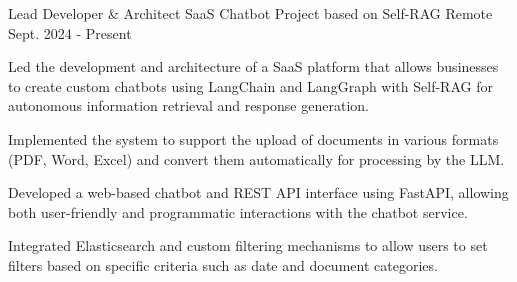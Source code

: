 
\begin{cventries}

  \cventry
    {Lead Developer \& Architect} %
    {SaaS Chatbot Project based on Self-RAG} %
    {Remote} %
    {Sept. 2024 - Present} %
    {
      \begin{cvitems} %
        \item {Led the development and architecture of a SaaS platform that allows businesses to create custom chatbots using LangChain and LangGraph with Self-RAG for autonomous information retrieval and response generation.}
        \item {Implemented the system to support the upload of documents in various formats (PDF, Word, Excel) and convert them automatically for processing by the LLM.}
        \item {Developed a web-based chatbot and REST API interface using FastAPI, allowing both user-friendly and programmatic interactions with the chatbot service.}
        \item {Integrated Elasticsearch and custom filtering mechanisms to allow users to set filters based on specific criteria such as date and document categories.}
      \end{cvitems}
    }

\end{cventries}
